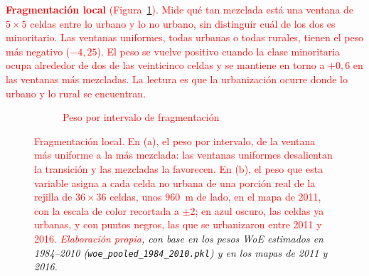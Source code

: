\textcolor{red}{\textbf{Fragmentación local} (Figura~\ref{fig:woe-fragmentacion}). Mide qué tan mezclada está una
ventana de $5\times5$ celdas entre lo urbano y lo no urbano, sin distinguir cuál
de los dos es minoritario. Las ventanas uniformes, todas urbanas o todas
rurales, tienen el peso más negativo ($-4{,}25$). El peso se vuelve positivo
cuando la clase minoritaria ocupa alrededor de dos de las veinticinco celdas y
se mantiene en torno a $+0{,}6$ en las ventanas más mezcladas. La lectura es
que la urbanización ocurre donde lo urbano y lo rural se encuentran.}

\begin{figure}[htbp]
  \centering
  \shorthandoff{<>}%
  \begin{subfigure}[b]{0.56\linewidth}
  \centering
  \caption{\textcolor{red}{Peso por intervalo de fragmentación}}
  \end{subfigure}\hfill
  \begin{subfigure}[b]{0.40\linewidth}
  \centering
  \end{subfigure}
  \caption{\textcolor{red}{Fragmentación local. En (a), el peso por intervalo, de la ventana más uniforme a la más mezclada: las ventanas uniformes desalientan la transición y las mezcladas la favorecen. En (b), el peso que esta variable asigna a cada celda no urbana de una porción real de la rejilla de $36\times36$ celdas, unos $960$~m de lado, en el mapa de 2011, con la escala de color recortada a $\pm2$; en azul oscuro, las celdas ya urbanas, y con puntos negros, las que se urbanizaron entre 2011 y 2016.} \textit{\textcolor{red}{Elaboración propia}, con base en los pesos WoE estimados en 1984--2010 (\texttt{woe\_pooled\_1984\_2010.pkl}) y en los mapas de 2011 y 2016.}}
  \label{fig:woe-fragmentacion}
\end{figure}


